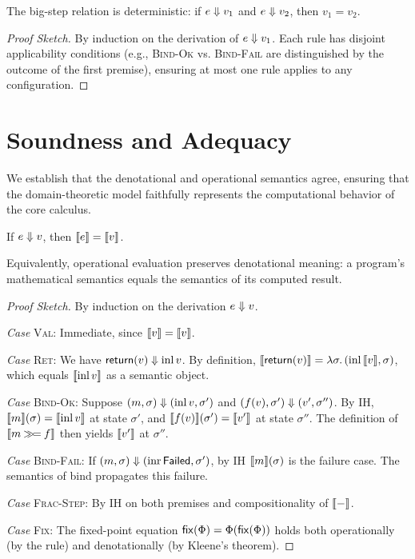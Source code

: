 \begin{proposition}[Determinism]
\label{prop:bigstep-determinism}
The big-step relation is deterministic: if $e \Downarrow v_1$ and $e \Downarrow v_2$,
then $v_1 = v_2$.
\end{proposition}

\begin{proof}[Proof Sketch]
By induction on the derivation of $e \Downarrow v_1$. Each rule has disjoint applicability
conditions (e.g., \textsc{Bind-Ok} vs. \textsc{Bind-Fail} are distinguished by the
outcome of the first premise), ensuring at most one rule applies to any configuration.
\end{proof}

\section{Soundness and Adequacy}
\label{sec:core-soundness}

We establish that the denotational and operational semantics agree, ensuring that
the domain-theoretic model faithfully represents the computational behavior of
the core calculus.

\begin{theorem}[Soundness]
\label{thm:core-soundness}
If $e \Downarrow v$, then $\llbracket e \rrbracket = \llbracket v \rrbracket$.

\noindent
Equivalently, operational evaluation preserves denotational meaning: a program's
mathematical semantics equals the semantics of its computed result.
\end{theorem}

\begin{proof}[Proof Sketch]
By induction on the derivation $e \Downarrow v$.

\textit{Case} \textsc{Val}: Immediate, since $\llbracket v \rrbracket = \llbracket v \rrbracket$.

\textit{Case} \textsc{Ret}: We have $\mathsf{return}(v) \Downarrow \mathrm{inl}\, v$.
By definition, $\llbracket \mathsf{return}(v) \rrbracket = \lambda \sigma.\, (\mathrm{inl}\,\llbracket v \rrbracket, \sigma)$,
which equals $\llbracket \mathrm{inl}\, v \rrbracket$ as a semantic object.

\textit{Case} \textsc{Bind-Ok}: Suppose $(m, \sigma) \Downarrow (\mathrm{inl}\, v, \sigma')$
and $(f(v), \sigma') \Downarrow (v', \sigma'')$. By IH, $\llbracket m \rrbracket(\sigma) = \llbracket \mathrm{inl}\, v \rrbracket$
at state $\sigma'$, and $\llbracket f(v) \rrbracket(\sigma') = \llbracket v' \rrbracket$ at state $\sigma''$.
The definition of $\llbracket m \mathbin{\gg\!=} f \rrbracket$ then yields $\llbracket v' \rrbracket$ at $\sigma''$.

\textit{Case} \textsc{Bind-Fail}: If $(m, \sigma) \Downarrow (\mathrm{inr}\,\mathsf{Failed}, \sigma')$,
by IH $\llbracket m \rrbracket(\sigma)$ is the failure case. The semantics of bind propagates this failure.

\textit{Case} \textsc{Frac-Step}: By IH on both premises and compositionality of $\llbracket - \rrbracket$.

\textit{Case} \textsc{Fix}: The fixed-point equation $\mathsf{fix}(\Phi) = \Phi(\mathsf{fix}(\Phi))$
holds both operationally (by the rule) and denotationally (by Kleene's theorem).
\end{proof}

